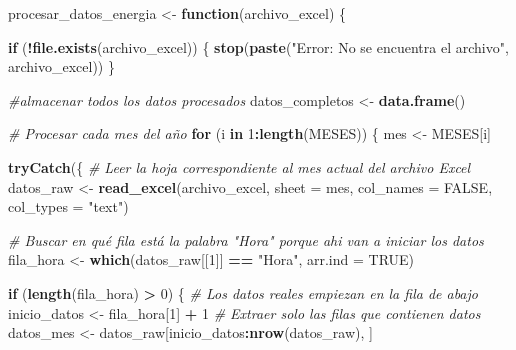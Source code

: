 \documentclass[
]{article}
\newenvironment{Shaded}{\begin{snugshade}}{\end{snugshade}}
\newcommand{\AttributeTok}[1]{\textcolor[rgb]{0.13,0.29,0.53}{#1}}
\newcommand{\CommentTok}[1]{\textcolor[rgb]{0.56,0.35,0.01}{\textit{#1}}}
\newcommand{\ConstantTok}[1]{\textcolor[rgb]{0.56,0.35,0.01}{#1}}
\newcommand{\ControlFlowTok}[1]{\textcolor[rgb]{0.13,0.29,0.53}{\textbf{#1}}}
\newcommand{\DecValTok}[1]{\textcolor[rgb]{0.00,0.00,0.81}{#1}}
\newcommand{\FunctionTok}[1]{\textcolor[rgb]{0.13,0.29,0.53}{\textbf{#1}}}
\newcommand{\NormalTok}[1]{#1}
\newcommand{\OtherTok}[1]{\textcolor[rgb]{0.56,0.35,0.01}{#1}}
\newcommand{\SpecialCharTok}[1]{\textcolor[rgb]{0.81,0.36,0.00}{\textbf{#1}}}
\newcommand{\StringTok}[1]{\textcolor[rgb]{0.31,0.60,0.02}{#1}}
\begin{document}
\begin{Shaded}
\begin{Highlighting}[]
\NormalTok{procesar\_datos\_energia }\OtherTok{\textless{}{-}} \ControlFlowTok{function}\NormalTok{(archivo\_excel) \{}
  
  \ControlFlowTok{if}\NormalTok{ (}\SpecialCharTok{!}\FunctionTok{file.exists}\NormalTok{(archivo\_excel)) \{}
    \FunctionTok{stop}\NormalTok{(}\FunctionTok{paste}\NormalTok{(}\StringTok{"Error: No se encuentra el archivo"}\NormalTok{, archivo\_excel))}
\NormalTok{  \}}
  
  \CommentTok{\#almacenar todos los datos procesados}
\NormalTok{  datos\_completos }\OtherTok{\textless{}{-}} \FunctionTok{data.frame}\NormalTok{()}
  
  \CommentTok{\# Procesar cada mes del año}
  \ControlFlowTok{for}\NormalTok{ (i }\ControlFlowTok{in} \DecValTok{1}\SpecialCharTok{:}\FunctionTok{length}\NormalTok{(MESES)) \{}
\NormalTok{    mes }\OtherTok{\textless{}{-}}\NormalTok{ MESES[i]}
    
    \FunctionTok{tryCatch}\NormalTok{(\{}
      \CommentTok{\# Leer la hoja correspondiente al mes actual del archivo Excel}
\NormalTok{      datos\_raw }\OtherTok{\textless{}{-}} \FunctionTok{read\_excel}\NormalTok{(archivo\_excel, }\AttributeTok{sheet =}\NormalTok{ mes, }\AttributeTok{col\_names =} \ConstantTok{FALSE}\NormalTok{, }\AttributeTok{col\_types =} \StringTok{"text"}\NormalTok{)}
      
      \CommentTok{\# Buscar en qué fila está la palabra "Hora" porque ahi van a iniciar los datos}
\NormalTok{      fila\_hora }\OtherTok{\textless{}{-}} \FunctionTok{which}\NormalTok{(datos\_raw[[}\DecValTok{1}\NormalTok{]] }\SpecialCharTok{==} \StringTok{"Hora"}\NormalTok{, }\AttributeTok{arr.ind =} \ConstantTok{TRUE}\NormalTok{)}
      
      \ControlFlowTok{if}\NormalTok{ (}\FunctionTok{length}\NormalTok{(fila\_hora) }\SpecialCharTok{\textgreater{}} \DecValTok{0}\NormalTok{) \{}
        \CommentTok{\# Los datos reales empiezan en la fila de abajo}
\NormalTok{        inicio\_datos }\OtherTok{\textless{}{-}}\NormalTok{ fila\_hora[}\DecValTok{1}\NormalTok{] }\SpecialCharTok{+} \DecValTok{1}
        \CommentTok{\# Extraer solo las filas que contienen datos}
\NormalTok{        datos\_mes }\OtherTok{\textless{}{-}}\NormalTok{ datos\_raw[inicio\_datos}\SpecialCharTok{:}\FunctionTok{nrow}\NormalTok{(datos\_raw), ]}
        

\end{Highlighting}
\end{Shaded}
\end{document}
